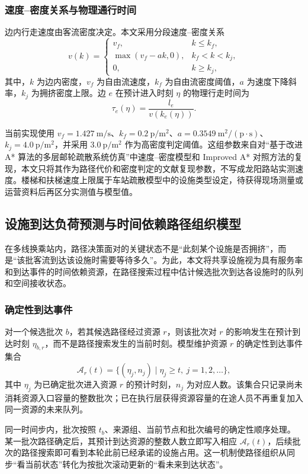 \documentclass[UTF8,a4paper,12pt]{ctexart}
\begin{document}
\subsubsection{速度--密度关系与物理通行时间}

边内行走速度由客流密度决定。本文采用分段速度--密度关系
\[
v(k)=
\begin{cases}
v_f, & k\leq k_f,\\
\max(v_f-ak,0), & k_f<k<k_j,\\
0, & k\geq k_j,
\end{cases}
\]
其中，\(k\) 为边内密度，\(v_f\) 为自由流速度，\(k_f\) 为自由流密度阈值，\(a\) 为速度下降斜率，\(k_j\) 为拥挤密度上限。边 \(e\) 在预计进入时刻 \(\eta\) 的物理行走时间为
\[
\tau_e(\eta)=\frac{l_e}{v(k_e(\eta))}.
\]

当前实现使用 \(v_f=1.427\ \mathrm{m/s}\)、\(k_f=0.2\ \mathrm{p/m^2}\)、\(a=0.3549\ \mathrm{m^2/(p\cdot s)}\)、\(k_j=4.0\ \mathrm{p/m^2}\)，并采用 \(3.0\ \mathrm{p/m^2}\) 作为高密度判定阈值。这组参数来自对“基于改进 A* 算法的多层邮轮疏散系统仿真”中速度--密度模型和 Improved A* 对照方法的复现，本文只将其作为路径代价和密度判定的文献复现参数，不写成龙阳路站实测速度。楼梯和扶梯速度上限属于车站疏散模型中的设施类型设定，待获得现场测量或运营资料后再区分实测值与模型值。

\subsection{设施到达负荷预测与时间依赖路径组织模型}

在多线换乘站内，路径决策面对的关键状态不是“此刻某个设施是否拥挤”，而是“该批客流到达该设施时需要等待多久”。为此，本文将共享设施视为具有服务率和到达事件的时间依赖资源，在路径搜索过程中估计候选批次到达各设施时的队列和空间接收状态。

\subsubsection{确定性到达事件}

对一个候选批次 \(b\)，若其候选路径经过资源 \(r\)，则该批次对 \(r\) 的影响发生在预计到达时刻 \(\eta_{b,r}\)，而不是路径搜索发生的当前时刻。模型维护资源 \(r\) 的确定性到达事件集合
\[
\mathcal{A}_r(t)=\{(\eta_j,n_j)\mid \eta_j\geq t,\ j=1,2,\ldots\},
\]
其中 \(\eta_j\) 为已确定批次进入资源 \(r\) 的预计时刻，\(n_j\) 为对应人数。该集合只记录尚未消耗资源入口容量的整数批次；已在执行层获得资源容量的在途人员不再重复加入同一资源的未来队列。

同一时间步内，批次按照 \(t_b\)、来源组、当前节点和批次编号的确定性顺序处理。某一批次路径确定后，其预计到达资源的整数人数立即写入相应 \(\mathcal{A}_r(t)\)，后续批次的路径搜索即可看到本轮此前已经承诺的设施占用。这一机制使路径组织从同步“看当前状态”转化为按批次滚动更新的“看未来到达状态”。
\end{document}
